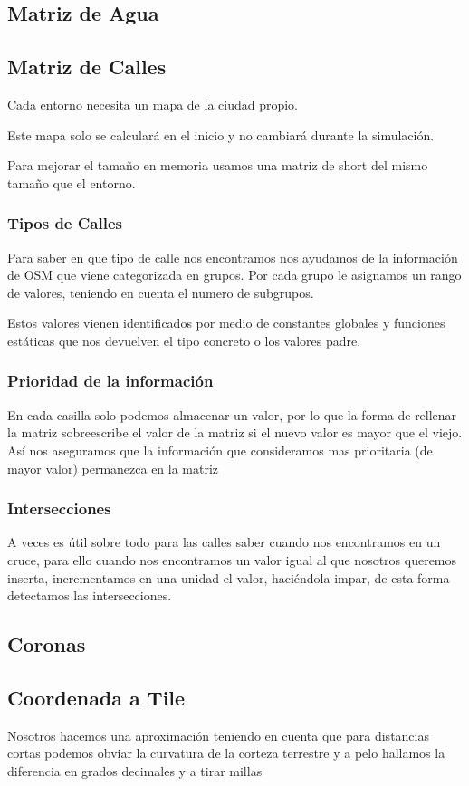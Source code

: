 \subsection*{Matriz de Agua}
\subsection*{Matriz de Calles}
Cada entorno necesita un mapa de la ciudad propio.

Este mapa solo se calculará en el inicio y no cambiará durante la simulación.

Para mejorar el tamaño en memoria usamos una matriz de short del mismo tamaño
que el entorno.
\subsubsection*{Tipos de Calles}
Para saber en que tipo de calle nos encontramos nos ayudamos de la información
de OSM que viene categorizada en grupos. Por cada grupo le asignamos un rango
de valores, teniendo en cuenta el numero de subgrupos.

Estos valores vienen identificados por medio de constantes globales y funciones
estáticas que nos devuelven el tipo concreto o los valores padre.
\subsubsection*{Prioridad de la información}
En cada casilla solo podemos almacenar un valor, por lo que la forma de
rellenar la matriz sobreescribe el valor de la matriz si el nuevo valor es
mayor que el viejo. Así nos aseguramos que la información que consideramos mas
prioritaria (de mayor valor) permanezca en la matriz
\subsubsection*{Intersecciones}
A veces es útil sobre todo para las calles saber cuando nos encontramos en un
cruce, para ello cuando nos encontramos un valor igual al que nosotros queremos
inserta, incrementamos en una unidad el valor, haciéndola impar, de esta forma
detectamos las intersecciones.
\subsection*{Coronas}
\subsection*{Coordenada a Tile}
Nosotros hacemos una aproximación teniendo en cuenta que para distancias cortas
podemos obviar la curvatura de la corteza terrestre y a pelo hallamos la
diferencia en grados decimales y a tirar millas
